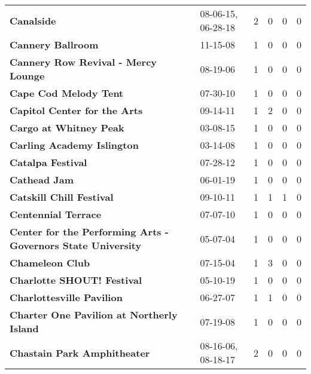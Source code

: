 \begin{supertabular}{p{0.4\textwidth}p{0.3\textwidth}p{0.05\textwidth}p{0.05\textwidth}p{0.05\textwidth}p{0.05\textwidth}}
                                                   \textbf{Canalside} &  08-06-15, 06-28-18 &  2 &  0 &  0 &  0 \\
                                            \textbf{Cannery Ballroom} &            11-15-08 &  1 &  0 &  0 &  0 \\
                          \textbf{Cannery Row Revival - Mercy Lounge} &            08-19-06 &  1 &  0 &  0 &  0 \\
                                        \textbf{Cape Cod Melody Tent} &            07-30-10 &  1 &  0 &  0 &  0 \\
                                 \textbf{Capitol Center for the Arts} &            09-14-11 &  1 &  2 &  0 &  0 \\
                                       \textbf{Cargo at Whitney Peak} &            03-08-15 &  1 &  0 &  0 &  0 \\
                                   \textbf{Carling Academy Islington} &            03-14-08 &  1 &  0 &  0 &  0 \\
                                            \textbf{Catalpa Festival} &            07-28-12 &  1 &  0 &  0 &  0 \\
                                                 \textbf{Cathead Jam} &            06-01-19 &  1 &  0 &  0 &  0 \\
                                     \textbf{Catskill Chill Festival} &            09-10-11 &  1 &  1 &  1 &  0 \\
                                          \textbf{Centennial Terrace} &            07-07-10 &  1 &  0 &  0 &  0 \\
 \textbf{Center for the Performing Arts - Governors State University} &            05-07-04 &  1 &  0 &  0 &  0 \\
                                              \textbf{Chameleon Club} &            07-15-04 &  1 &  3 &  0 &  0 \\
                                   \textbf{Charlotte SHOUT! Festival} &            05-10-19 &  1 &  0 &  0 &  0 \\
                                    \textbf{Charlottesville Pavilion} &            06-27-07 &  1 &  1 &  0 &  0 \\
                    \textbf{Charter One Pavilion at Northerly Island} &            07-19-08 &  1 &  0 &  0 &  0 \\
                                  \textbf{Chastain Park Amphitheater} &  08-16-06, 08-18-17 &  2 &  0 &  0 &  0 \\

\end{supertabular}
